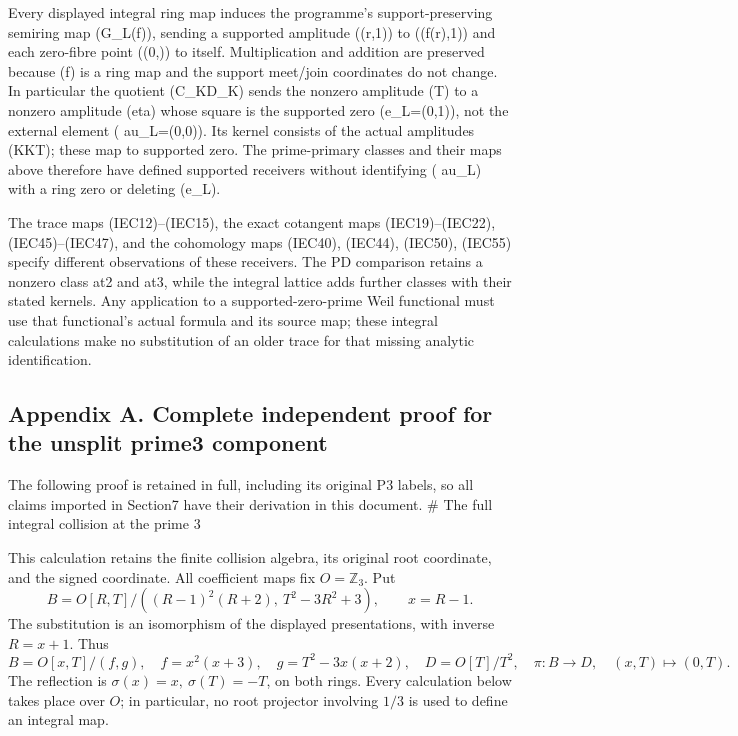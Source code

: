 \documentclass[
  10pt,
]{article}
\begin{document}
Every displayed integral ring map induces the programme's
support-preserving semiring map (G\_L(f)), sending a supported amplitude
((r,1)) to ((f(r),1)) and each zero-fibre point ((0,\lambda)) to itself.
Multiplication and addition are preserved because (f) is a ring map and
the support meet/join coordinates do not change. In particular the
quotient (C\_K\to D\_K) sends the nonzero amplitude (T) to a nonzero
amplitude (eta) whose square is the supported zero (e\_L=(0,1)), not the
external element ( au\_L=(0,0)). Its kernel consists of the actual
amplitudes (K\epsilon\oplus K\epsilon T); these map to supported zero.
The prime-primary classes and their maps above therefore have defined
supported receivers without identifying ( au\_L) with a ring zero or
deleting (e\_L).

The trace maps (IEC12)--(IEC15), the exact cotangent maps
(IEC19)--(IEC22), (IEC45)--(IEC47), and the cohomology maps (IEC40),
(IEC44), (IEC50), (IEC55) specify different observations of these
receivers. The PD comparison retains a nonzero class at2 and at3, while
the integral lattice adds further classes with their stated kernels. Any
application to a supported-zero-prime Weil functional must use that
functional's actual formula and its source map; these integral
calculations make no substitution of an older trace for that missing
analytic identification.

\subsection{Appendix A. Complete independent proof for the unsplit
prime3
component}\label{appendix-a.-complete-independent-proof-for-the-unsplit-prime3-component}

The following proof is retained in full, including its original P3
labels, so all claims imported in Section7 have their derivation in this
document. \# The full integral collision at the prime 3

This calculation retains the finite collision algebra, its original root
coordinate, and the signed coordinate. All coefficient maps fix
\(O=\mathbb Z_3\). Put \[
B=O[R,T]/((R-1)^2(R+2),\ T^2-3R^2+3),\qquad x=R-1.
\tag{P3-1}
\] The substitution is an isomorphism of the displayed presentations,
with inverse \(R=x+1\). Thus \[
B=O[x,T]/(f,g),\quad f=x^2(x+3),\quad
g=T^2-3x(x+2),\quad D=O[T]/T^2,
\quad\pi:B\longrightarrow D,\quad(x,T)\longmapsto(0,T).
\tag{P3-2}
\] The reflection is \(\sigma(x)=x,\ \sigma(T)=-T\), on both rings.
Every calculation below takes place over \(O\); in particular, no root
projector involving \(1/3\) is used to define an integral map.
\end{document}
